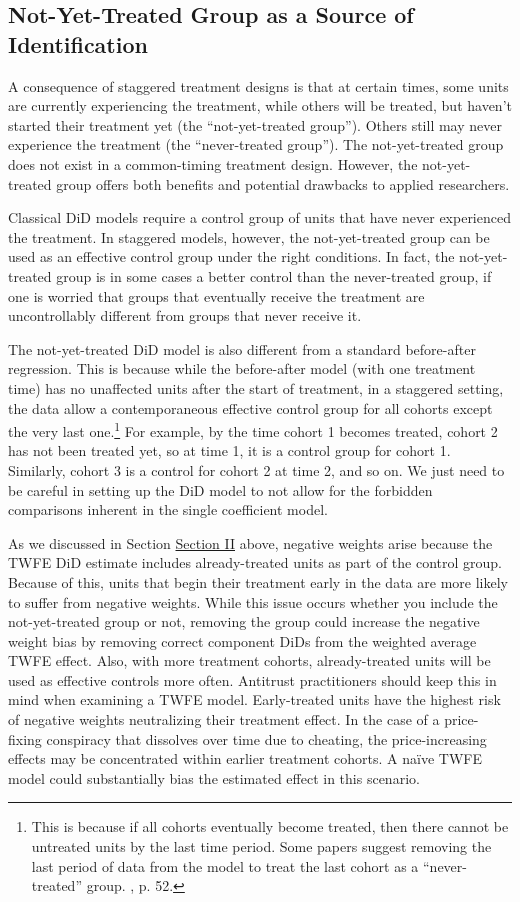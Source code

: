 \documentclass[12pt]{article}
\begin{document}
\subsection{Not-Yet-Treated Group as a Source of Identification}
A consequence of staggered treatment designs is that at certain times, some units are currently experiencing the treatment, while others will be treated, but haven’t started their treatment yet (the “not-yet-treated group”). Others still may never experience the treatment (the “never-treated group”). The not-yet-treated group does not exist in a common-timing treatment design. However, the not-yet-treated group offers both benefits and potential drawbacks to applied researchers.

Classical DiD models require a control group of units that have never experienced the treatment. In staggered models, however, the not-yet-treated group can be used as an effective control group under the right conditions. In fact, the not-yet-treated group is in some cases a better control than the never-treated group, if one is worried that groups that eventually receive the treatment are uncontrollably different from groups that never receive it.

The not-yet-treated DiD model is also different from a standard before-after regression. This is because while the before-after model (with one treatment time) has no unaffected units after the start of treatment, in a staggered setting, the data allow a contemporaneous effective control group for all cohorts except the very last one.\footnote{This is because if all cohorts eventually become treated, then there cannot be untreated units by the last time period. Some papers suggest removing the last period of data from the model to treat the last cohort as a “never-treated” group. \citet{wooldridge2021two}, p. 52.}  For example, by the time cohort 1 becomes treated, cohort 2 has not been treated yet, so at time 1, it is a control group for cohort 1. Similarly, cohort 3 is a control for cohort 2 at time 2, and so on. We just need to be careful in setting up the DiD model to not allow for the forbidden comparisons inherent in the single coefficient model.

As we discussed in Section \hyperref[sec:literature]{Section II} above, negative weights arise because the TWFE DiD estimate includes already-treated units as part of the control group.  Because of this, units that begin their treatment early in the data are more likely to suffer from negative weights. While this issue occurs whether you include the not-yet-treated group or not, removing the group could increase the negative weight bias by removing correct component DiDs from the weighted average TWFE effect. Also, with more treatment cohorts, already-treated units will be used as effective controls more often. Antitrust practitioners should keep this in mind when examining a TWFE model. Early-treated units have the highest risk of negative weights neutralizing their treatment effect. In the case of a price-fixing conspiracy that dissolves over time due to cheating, the price-increasing effects may be concentrated within earlier treatment cohorts. A naïve TWFE model could substantially bias the estimated effect in this scenario.
\end{document}
